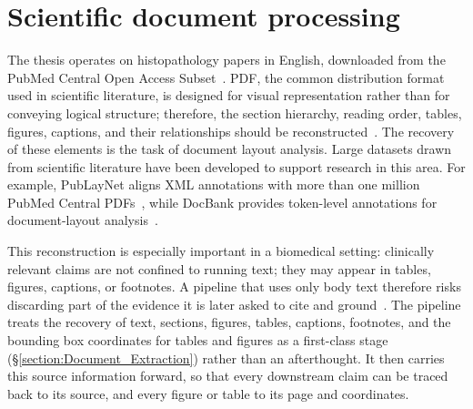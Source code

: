 \section{Scientific document processing}\label{section:background-scientific-doc-processing}

The thesis operates on histopathology papers in English, downloaded from the PubMed Central Open Access Subset~\parencite{nlm_pmc_open_access}. PDF, the common distribution format used in scientific literature, is designed for visual representation rather than for conveying logical structure; therefore, the section hierarchy, reading order, tables, figures, captions, and their relationships should be reconstructed~\parencite{wang2024detectorderconstructtreeconstruction, meunier2005optimizedxycutdetermining, chen2025graphbaseddocumentstructure}. The recovery of these elements is the task of document layout analysis. Large datasets drawn from scientific literature have been developed to support research in this area. For example, PubLayNet aligns XML annotations with more than one million PubMed Central PDFs~\parencite{zhong2019publaynetlargestdataset}, while DocBank provides token-level annotations for document-layout analysis~\parencite{li2020docbankbenchmarkdataset}.

This reconstruction is especially important in a biomedical setting: clinically relevant claims are not confined to running text; they may appear in tables, figures, captions, or footnotes. A pipeline that uses only body text therefore risks discarding part of the evidence it is later asked to cite and ground~\parencite{subramanian2020medicatdatasetmedical, oshima2024syntheticcontextllm}. The pipeline treats the recovery of text, sections, figures, tables, captions, footnotes, and the bounding box coordinates for tables and figures as a first-class stage (§\ref{section:Document_Extraction}) rather than an afterthought. It then carries this source information forward, so that every downstream claim can be traced back to its source, and every figure or table to its page and coordinates.
